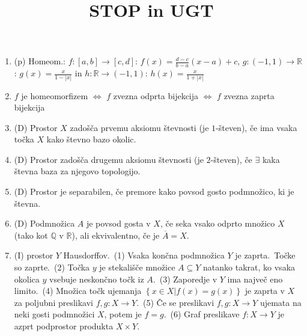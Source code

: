 \documentclass[10pt,a4paper]{article}
\title{STOP in UGT}
\author{}
\date{}
\begin{document}

\begin{enumerate} 
    \setlength\itemsep{-1px}%

\item (p) Homeom.: $f: [a,b]\to[c,d]$: $f(x)=\frac{d-c}{b-a}(x-a)+c$,
$g: (-1,1)\to\mathbb{R}$: $g(x)=\frac{x}{1-|x|}$ in 
$h: \mathbb{R}\to(-1,1)$: $h(x)=\frac{x}{1+|x|}$

\item \(f\) je homeomorfizem \(\iff\) \(f\) zvezna odprta bijekcija \(\iff\) \(f\) zvezna zaprta bijekcija
            
\item (D) Prostor $X$ zadošča prvemu aksiomu števnosti (je $1$-števen), če ima vsaka točka $X$ kako števno bazo okolic.
            
\item (D) Prostor zadošča drugemu aksiomu števnosti (je $2$-števen), če $\exists$ kaka števna baza za njegovo topologijo.
            
\item (D) Prostor je separabilen, če premore kako povsod gosto podmnožico, ki je števna.
\item (D) Podmnožica $A$ je povsod gosta v $X$, če seka vsako odprto množico $X$ (tako kot $\mathbb{Q}$ v $\mathbb{R}$), ali ekvivalentno, če je $\overline{A}=X$.


\item (I)  prostor $Y$ Hausdorffov.~(1) Vsaka končna podmnožica $Y$ je zaprta.~Točke so zaprte.~(2) Točka $y$ je stekališče množice $A\subseteq Y$ natanko takrat, ko vsaka okolica $y$ vsebuje neskončno točk iz $A$.~(3) Zaporedje v $Y$ ima največ eno limito.~(4) Množica točk ujemanja $\left\{x\in X | f(x)=g(x)\right\}$ je zaprta v $X$ za poljubni preslikavi $f,g: X\to Y$.~(5) Če se preslikavi $f,g: X\to Y$ ujemata na neki gosti podmnožici $X$, potem je $f=g$.~(6) Graf preslikave $f: X\to Y$ je azprt podprostor produkta $X\times Y$.


\end{enumerate}
\end{document}
